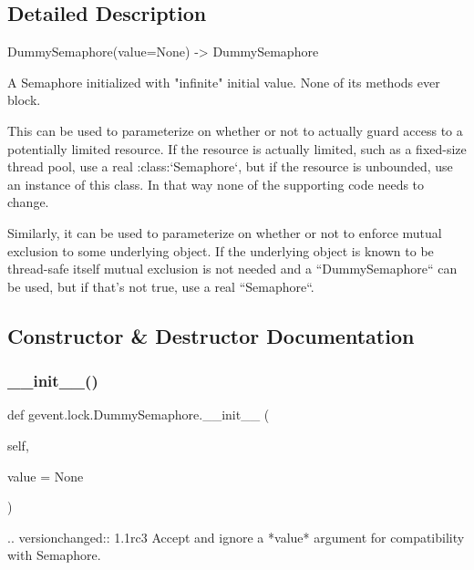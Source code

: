 \subsection{Detailed Description}
\begin{DoxyVerb}DummySemaphore(value=None) -> DummySemaphore

A Semaphore initialized with "infinite" initial value. None of its
methods ever block.

This can be used to parameterize on whether or not to actually
guard access to a potentially limited resource. If the resource is
actually limited, such as a fixed-size thread pool, use a real
:class:`Semaphore`, but if the resource is unbounded, use an
instance of this class. In that way none of the supporting code
needs to change.

Similarly, it can be used to parameterize on whether or not to
enforce mutual exclusion to some underlying object. If the
underlying object is known to be thread-safe itself mutual
exclusion is not needed and a ``DummySemaphore`` can be used, but
if that's not true, use a real ``Semaphore``.
\end{DoxyVerb}
 

\subsection{Constructor \& Destructor Documentation}
\mbox{\label{classgevent_1_1lock_1_1_dummy_semaphore_ab6c0219ecff8c5ac7aee4e5238841300}} 
\subsubsection{\texorpdfstring{\+\_\+\+\_\+init\+\_\+\+\_\+()}{\_\_init\_\_()}}
{\footnotesize\ttfamily def gevent.\+lock.\+Dummy\+Semaphore.\+\_\+\+\_\+init\+\_\+\+\_\+ (\begin{DoxyParamCaption}\item[{}]{self,  }\item[{}]{value = {\ttfamily None} }\end{DoxyParamCaption})}

\begin{DoxyVerb}.. versionchanged:: 1.1rc3
    Accept and ignore a *value* argument for compatibility with Semaphore.
\end{DoxyVerb}
 

